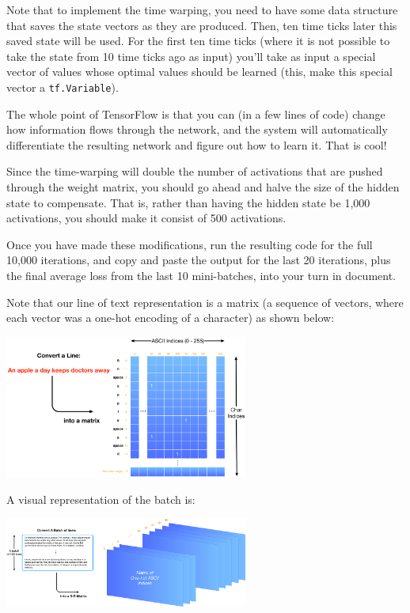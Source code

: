 \documentclass[11pt]{article}
\renewcommand\:{\colon} %
\begin{document}
Note that to implement the time warping, you need to have some data structure that saves the state
vectors as they are produced. Then, ten time ticks later this saved state will be used. For the first ten time
ticks (where it is not possible to take the state from 10 time ticks ago as input) you'll take as input a special
vector of values whose optimal values should be learned (this, make this special vector a \texttt{tf.Variable}).

The whole point of TensorFlow is that you can (in a few lines of code) change how information flows
through the network, and the system will automatically differentiate the resulting network and figure out
how to learn it. That is cool!

Since the time-warping will double the number of activations that are pushed through the weight matrix,
you should go ahead and halve the size of the hidden state to compensate. That is, rather than having the
hidden state be 1,000 activations, you should make it consist of 500 activations.

Once you have made these modifications, run the resulting code for the full 10,000 iterations, and copy
and paste the output for the last 20 iterations, plus the final average loss from the last 10 mini-batches, into your turn in document. 

Note that our line of text representation is a matrix (a sequence of vectors, where each vector was a one-hot encoding of a character) as shown below:

\includegraphics[width=0.6\textwidth]{onehotencoding.pdf}

A visual representation of the batch is:

\includegraphics[width=0.6\textwidth]{batch.pdf}
\end{document}
